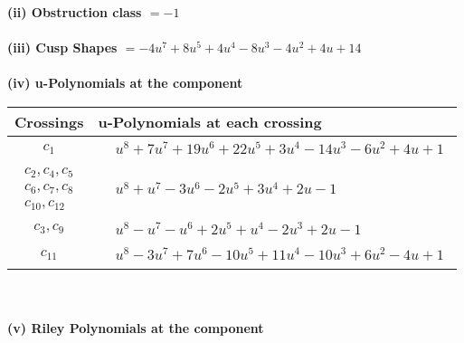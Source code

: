\documentclass[1p]{elsarticle_modified}
\theoremstyle{definition}
\begin{document}
\flushleft \textbf{(ii) Obstruction class $= -1$}\\~\\
\flushleft \textbf{(iii) Cusp Shapes $= -4 u^7+8 u^5+4 u^4-8 u^3-4 u^2+4 u+14$}\\~\\
\newpage\renewcommand{\arraystretch}{1}
\flushleft \textbf{(iv) u-Polynomials at the component}\newline \\
\begin{tabular}{m{50pt}|m{274pt}}
Crossings & \hspace{64pt}u-Polynomials at each crossing \\
\hline $$\begin{aligned}c_{1}\end{aligned}$$&$\begin{aligned}
&u^8+7 u^7+19 u^6+22 u^5+3 u^4-14 u^3-6 u^2+4 u+1
\end{aligned}$\\
\hline $$\begin{aligned}c_{2},c_{4},c_{5}\\c_{6},c_{7},c_{8}\\c_{10},c_{12}\end{aligned}$$&$\begin{aligned}
&u^8+u^7-3 u^6-2 u^5+3 u^4+2 u-1
\end{aligned}$\\
\hline $$\begin{aligned}c_{3},c_{9}\end{aligned}$$&$\begin{aligned}
&u^8- u^7- u^6+2 u^5+u^4-2 u^3+2 u-1
\end{aligned}$\\
\hline $$\begin{aligned}c_{11}\end{aligned}$$&$\begin{aligned}
&u^8-3 u^7+7 u^6-10 u^5+11 u^4-10 u^3+6 u^2-4 u+1
\end{aligned}$\\
\hline
\end{tabular}\\~\\
\newpage\renewcommand{\arraystretch}{1}
\flushleft \textbf{(v) Riley Polynomials at the component}\newline \\
\end{document}
